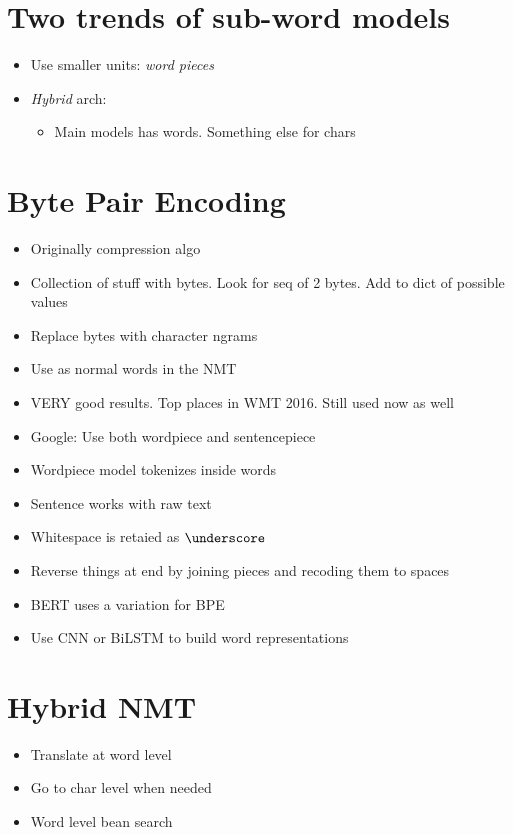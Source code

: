 \documentclass[a4paper]{article}
\begin{document}
\section{Two trends of sub-word models}
\begin{itemize}
    \item Use smaller units: \textit{word pieces} 
    \item \textit{Hybrid} arch:
    \begin{itemize}
        \item Main models has words. Something else for chars
    \end{itemize}
\end{itemize}
\section{Byte Pair Encoding}
\begin{itemize}
    \item Originally compression algo
    \item Collection of stuff with bytes. Look for seq of 2 bytes. Add to dict of possible values
    \item Replace bytes with character ngrams
    \item Use as normal words in the NMT
    \item VERY good results. Top places in WMT 2016. Still used now as well
    \item Google: Use both wordpiece and sentencepiece
    \item Wordpiece model tokenizes inside words
    \item Sentence works with raw text
    \item Whitespace is retaied as $\underscore$ 
    \item Reverse things at end by joining pieces and recoding them to spaces
    \item BERT uses a variation for BPE
    \item Use CNN or BiLSTM to build word representations
\end{itemize}
\section{Hybrid NMT}
\begin{itemize}
    \item Translate at word level
    \item Go to char level when needed
    \item Word level bean search
\end{itemize}
\end{document}
